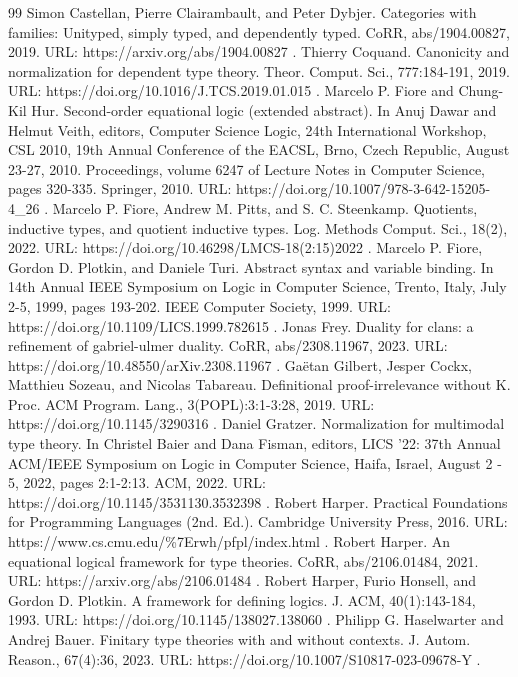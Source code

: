 \documentclass[10pt,a4paper]{amsart}
\begin{document}
\begin{thebibliography}{99}
 Simon Castellan, Pierre Clairambault, and Peter Dybjer. Categories with families: Unityped, simply typed, and dependently typed. CoRR, abs/1904.00827, 2019. URL: https://arxiv.org/abs/1904.00827 .
 Thierry Coquand. Canonicity and normalization for dependent type theory. Theor. Comput. Sci., 777:184-191, 2019. URL: https://doi.org/10.1016/J.TCS.2019.01.015 .
 Marcelo P. Fiore and Chung-Kil Hur. Second-order equational logic (extended abstract). In Anuj Dawar and Helmut Veith, editors, Computer Science Logic, 24th International Workshop, CSL 2010, 19th Annual Conference of the EACSL, Brno, Czech Republic, August 23-27, 2010. Proceedings, volume 6247 of Lecture Notes in Computer Science, pages 320-335. Springer, 2010. URL: https://doi.org/10.1007/978-3-642-15205-4\_26 .
 Marcelo P. Fiore, Andrew M. Pitts, and S. C. Steenkamp. Quotients, inductive types, and quotient inductive types. Log. Methods Comput. Sci., 18(2), 2022. URL: https://doi.org/10.46298/LMCS-18(2:15)2022 .
 Marcelo P. Fiore, Gordon D. Plotkin, and Daniele Turi. Abstract syntax and variable binding. In 14th Annual IEEE Symposium on Logic in Computer Science, Trento, Italy, July 2-5, 1999, pages 193-202. IEEE Computer Society, 1999. URL: https://doi.org/10.1109/LICS.1999.782615 .
 Jonas Frey. Duality for clans: a refinement of gabriel-ulmer duality. CoRR, abs/2308.11967, 2023. URL: https://doi.org/10.48550/arXiv.2308.11967 .
 Gaëtan Gilbert, Jesper Cockx, Matthieu Sozeau, and Nicolas Tabareau. Definitional proof-irrelevance without K. Proc. ACM Program. Lang., 3(POPL):3:1-3:28, 2019. URL: https://doi.org/10.1145/3290316 .
 Daniel Gratzer. Normalization for multimodal type theory. In Christel Baier and Dana Fisman, editors, LICS '22: 37th Annual ACM/IEEE Symposium on Logic in Computer Science, Haifa, Israel, August 2 - 5, 2022, pages 2:1-2:13. ACM, 2022. URL: https://doi.org/10.1145/3531130.3532398 .
 Robert Harper. Practical Foundations for Programming Languages (2nd. Ed.). Cambridge University Press, 2016. URL: https://www.cs.cmu.edu/\%7Erwh/pfpl/index.html .
 Robert Harper. An equational logical framework for type theories. CoRR, abs/2106.01484, 2021. URL: https://arxiv.org/abs/2106.01484 .
 Robert Harper, Furio Honsell, and Gordon D. Plotkin. A framework for defining logics. J. ACM, 40(1):143-184, 1993. URL: https://doi.org/10.1145/138027.138060 .
 Philipp G. Haselwarter and Andrej Bauer. Finitary type theories with and without contexts. J. Autom. Reason., 67(4):36, 2023. URL: https://doi.org/10.1007/S10817-023-09678-Y .

\end{thebibliography}
\end{document}
